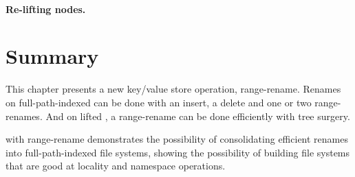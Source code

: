\paragraph{Re-lifting nodes.}

\section{Summary}

This chapter presents a new key/value store operation, range-rename.
Renames on full-path-indexed \betrfs can be done with an insert, a delete and
one or two range-renames.
And on lifted \bets, a range-rename can be done efficiently with tree surgery.

\betrfs with range-rename demonstrates the possibility of consolidating
efficient renames into full-path-indexed file systems, showing the possibility
of building file systems that are good at locality and namespace operations.

